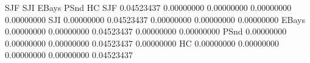 \begin{Schunk}
\begin{Soutput}
             SJF        SJI      EBays       PSnd         HC
SJF   0.04523437 0.00000000 0.00000000 0.00000000 0.00000000
SJI   0.00000000 0.04523437 0.00000000 0.00000000 0.00000000
EBays 0.00000000 0.00000000 0.04523437 0.00000000 0.00000000
PSnd  0.00000000 0.00000000 0.00000000 0.04523437 0.00000000
HC    0.00000000 0.00000000 0.00000000 0.00000000 0.04523437
\end{Soutput}
\end{Schunk}
